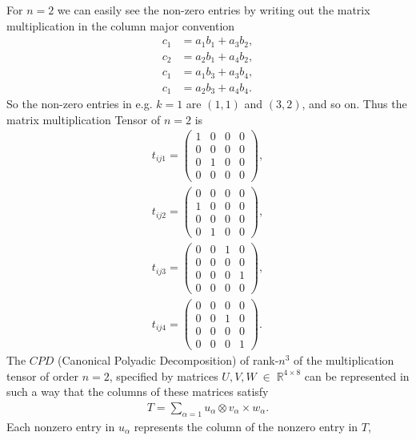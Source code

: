 \documentclass[a4paper]{article}
\begin{document}
For $n = 2$ we can easily see the non-zero entries by writing out the matrix
multiplication in the column major convention
\begin{align}
    c_1 &= a_1b_1 + a_3b_2,\\
    c_2 &= a_2b_1 + a_4b_2,\\
    c_1 &= a_1b_3 + a_3b_4,\\
    c_1 &= a_2b_3 + a_4b_4.
\end{align}
So the non-zero entries in e.g. $k=1$ are $(1, 1)$ and $(3, 2)$, and so on.
Thus the matrix multiplication Tensor of $n=2$ is
\begin{align}
t_{ij1} = \begin{pmatrix}
    1 & 0 & 0 & 0\\
    0 & 0 & 0 & 0\\
    0 & 1 & 0 & 0\\
    0 & 0 & 0 & 0
    \end{pmatrix},\\
t_{ij2}=
\begin{pmatrix}
    0 & 0 & 0 & 0\\
    1 & 0 & 0 & 0\\
    0 & 0 & 0 & 0\\
    0 & 1 & 0 & 0
\end{pmatrix},\\
t_{ij3}=
\begin{pmatrix}
    0 & 0 & 1 & 0\\
    0 & 0 & 0 & 0\\
    0 & 0 & 0 & 1\\
    0 & 0 & 0 & 0
\end{pmatrix},\\
t_{ij4}=
\begin{pmatrix}
    0 & 0 & 0 & 0\\
    0 & 0 & 1 & 0\\
    0 & 0 & 0 & 0\\
    0 & 0 & 0 & 1
\end{pmatrix}.
\end{align}
The $CPD$ (Canonical Polyadic Decomposition) of rank-$n^3$ of the multiplication tensor of
order $n = 2$, specified by matrices $U, V, W \;\in \; \mathbb{R}^{4\times 8}$
can be represented in such a way that the columns of these matrices satisfy
\begin{align}
    T = \sum_{\alpha=1}u_\alpha \otimes v_\alpha \times w_\alpha.
\end{align}
Each nonzero entry in $u_\alpha$ represents the column of the nonzero entry in $T$,
\end{document}
